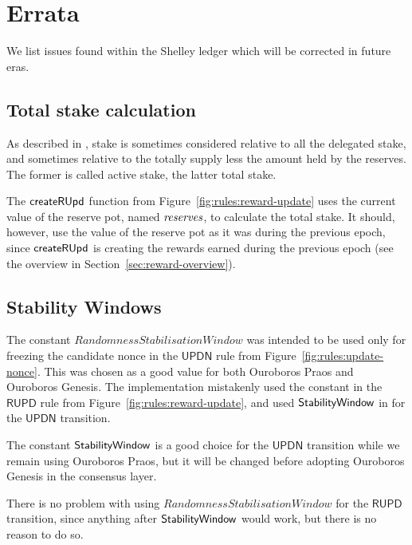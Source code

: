 \section{Errata}
\label{sec:errata}

We list issues found within the Shelley ledger which will be corrected in future eras.

\subsection{Total stake calculation}
\label{sec:errata:total-stake}

As described in \cite[3.4.3]{delegation_design}, stake is sometimes considered
relative to all the delegated stake, and sometimes relative to the
totally supply less the amount held by the reserves.
The former is called active stake, the latter total stake.


The $\mathsf{createRUpd}$ function from Figure~\ref{fig:rules:reward-update} uses the
current value of the reserve pot, named $\mathit{reserves}$, to calculate the total stake.
It should, however, use the value of the reserve pot as it was during the previous
epoch, since $\mathsf{createRUpd}$ is creating the rewards earned during the previous epoch
(see the overview in Section~\ref{sec:reward-overview}).

\subsection{Stability Windows}
\label{sec:errata:stability-windows}

The constant $RandomnessStabilisationWindow$ was intended to be used only
for freezing the candidate nonce in the $\mathsf{UPDN}$ rule
from Figure~\ref{fig:rules:update-nonce}.
This was chosen as a good value for both Ouroboros Praos and Ouroboros Genesis.
The implementation mistakenly used the constant in the $\mathsf{RUPD}$ rule
from Figure~\ref{fig:rules:reward-update}, and used $\mathsf{StabilityWindow}$
in for the $\mathsf{UPDN}$ transition.

The constant $\mathsf{StabilityWindow}$ is a good choice for the $\mathsf{UPDN}$
transition while we remain using Ouroboros Praos, but it will be changed before
adopting Ouroboros Genesis in the consensus layer.

There is no problem with using $RandomnessStabilisationWindow$ for the
$\mathsf{RUPD}$ transition, since anything after $\mathsf{StabilityWindow}$ would work,
but there is no reason to do so.
